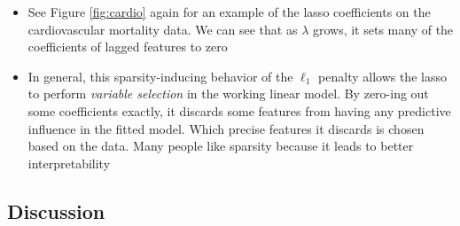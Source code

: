 \documentclass{article}
\begin{document}
\begin{itemize}
\item See Figure \ref{fig:cardio} again for an example of the lasso coefficients
  on the cardiovascular mortality data. We can see that as $\lambda$ grows, it
  sets many of the coefficients of lagged features to zero

\item In general, this sparsity-inducing behavior of the $\ell_1$ penalty allows
  the lasso to perform \emph{variable selection} in the working linear model. By
  zero-ing out some coefficients exactly, it discards some features from having
  any predictive influence in the fitted model. Which precise features it
  discards is chosen based on the data. Many people like sparsity because it
  leads to better interpretability  
\end{itemize}

\subsection{Discussion}
\end{document}
